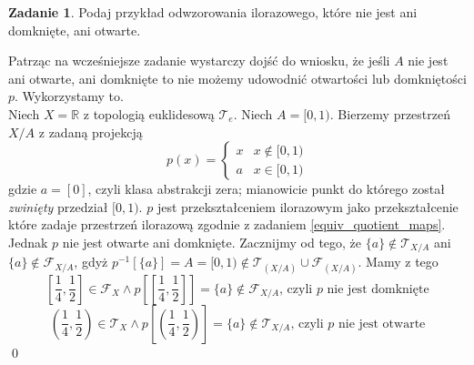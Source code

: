 \documentclass{article}
\theoremstyle{definition}%
\theoremstyle{theorem}
\newtheorem{zad}{Zadanie}
\renewenvironment{proof}{{\bfseries Rozwiązanie \\}}{\qed}
\newcommand{\R}{\mathbb{R}} %
\newcommand{\sT}{\mathcal{T}} %
\newcommand{\sF}{\mathcal{F}} %
\begin{document}
	\begin{zad}
		Podaj przykład odwzorowania ilorazowego, które nie jest ani domknięte, ani otwarte.
	\end{zad}
	\begin{proof}
		
		Patrząc na wcześniejsze zadanie wystarczy dojść do wniosku, że jeśli $A$ nie jest ani otwarte, ani domknięte to nie możemy udowodnić otwartości lub domkniętości $p$. Wykorzystamy to. \\
		Niech $X=\R$ z topologią euklidesową $\sT_e$. Niech $A = [0,1)$. Bierzemy przestrzeń $X/A$ z zadaną projekcją
		\[
		p(x) = \begin{cases}
		x & x \notin [0,1) \\
		a & x \in [0,1)
		\end{cases}
		\]
		gdzie $a=[0]$, czyli klasa abstrakcji zera; mianowicie punkt do którego został \textit{zwinięty} przedział $[0,1)$.
		$p$ jest przekształceniem ilorazowym jako przekształcenie które zadaje przestrzeń ilorazową zgodnie z zadaniem \ref{equiv_quotient_maps}. \\
		Jednak $p$ nie jest otwarte ani domknięte. Zacznijmy od tego, że $\{a\} \notin \sT_{X/A}$ ani $\{a\} \notin \sF_{X/A}$, gdyż $p^{-1}[\{a\}] = A=[0,1) \notin \sT_{(X/A)} \cup \sF_{(X/A)}$.
		Mamy z tego
		\[
		\left[\frac14,\frac12\right] \in \sF_X \wedge p\left[\left[\frac14,\frac12\right]\right]=\{a\} \notin\sF_{X/A}\text{, czyli } p\text{ nie jest domknięte}
		\]
		\[
		\left(\frac14,\frac12\right) \in \sT_X \wedge p\left[\left(\frac14,\frac12\right)\right]=\{a\}\notin \sT_{X/A}\text{, czyli } p\text{ nie jest otwarte}
		\]
	\end{proof}
\end{document}
